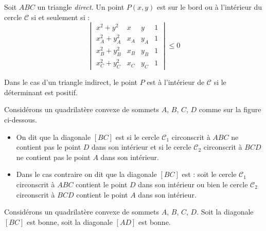 \documentclass[11pt,class=report,crop=false]{standalone}
\begin{document}



\begin{proposition}
Soit $ABC$ un triangle \emph{direct}.
Un point $P(x,y)$ est sur le bord ou à l'intérieur du cercle $\mathcal{C}$ si et seulement si :
$$\begin{vmatrix}
	x^2+y^2     & x   & y   & 1 \\
	x_A^2+y_A^2 & x_A & y_A & 1 \\ 
	x_B^2+y_B^2 & x_B & y_B & 1 \\ 
	x_C^2+y_C^2 & x_C & y_C & 1 
\end{vmatrix} \le 0$$
\end{proposition}
Dans le cas d'un triangle indirect, le point $P$ est à l'intérieur de $\mathcal{C}$ si le déterminant est positif.



Considérons un quadrilatère convexe de sommets $A$, $B$, $C$, $D$ comme sur la figure ci-dessous.

\begin{itemize}
	\item On dit que la diagonale $[BC]$ est  si le cercle $\mathcal{C}_1$ circonscrit à $ABC$ ne contient pas le point $D$ dans son intérieur
et si le cercle $\mathcal{C}_2$ circonscrit à $BCD$ ne contient pas le point $A$ dans son intérieur.


    \item Dans le cas contraire on dit que la diagonale $[BC]$ est  : soit le cercle $\mathcal{C}_1$ circonscrit à $ABC$ contient le point $D$ dans son intérieur
    ou bien le cercle $\mathcal{C}_2$ circonscrit à $BCD$ contient le point $A$ dans son intérieur.
    


\end{itemize}




\begin{proposition}
Considérons un quadrilatère convexe de sommets $A$, $B$, $C$, $D$.
Soit la diagonale $[BC]$ est bonne, soit la diagonale $[AD]$ est bonne.
\end{proposition}

\end{document}

